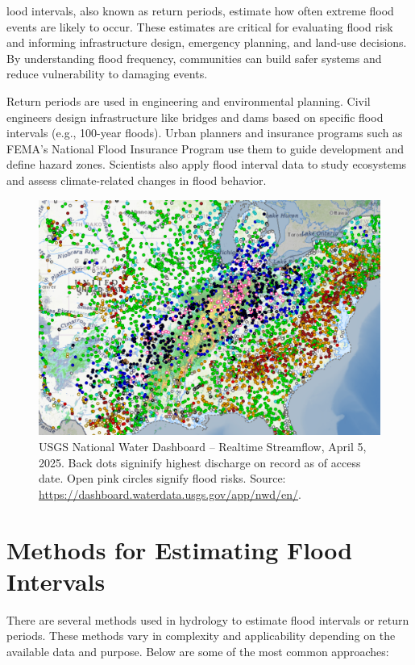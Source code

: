 \documentclass{tufte-handout}\usepackage[]{graphicx}\usepackage[]{xcolor}
\begin{document}
lood intervals, also known as return periods, estimate how often extreme flood events are likely to occur. These estimates are critical for evaluating flood risk and informing infrastructure design, emergency planning, and land-use decisions. By understanding flood frequency, communities can build safer systems and reduce vulnerability to damaging events.

Return periods are used in engineering and environmental planning. Civil engineers design infrastructure like bridges and dams based on specific flood intervals (e.g., 100-year floods). Urban planners and insurance programs such as FEMA's National Flood Insurance Program use them to guide development and define hazard zones. Scientists also apply flood interval data to study ecosystems and assess climate-related changes in flood behavior.

\begin{figure}
	\centering
		\includegraphics[width=1.00\textwidth]{figure/USGS_Discharge_20250405.png}
		\caption{USGS National Water Dashboard -- Realtime Streamflow, April 5, 2025. Back dots signinify highest discharge on record as of access date. Open pink circles signify flood risks. Source: \url{https://dashboard.waterdata.usgs.gov/app/nwd/en/}.}
	\label{fig:USGS_Discharge_20250405}
\end{figure}


\section{Methods for Estimating Flood Intervals}

There are several methods used in hydrology to estimate flood intervals or return periods. These methods vary in complexity and applicability depending on the available data and purpose. Below are some of the most common approaches:
\end{document}
